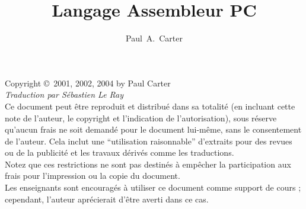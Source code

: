 \documentclass[11pt]{book}
\author{Paul~A.~Carter}
\title{Langage Assembleur PC}
\newif\ifmypdf
\begin{document}
\maketitle
\newlength{\AsmMargin}
\setlength{\AsmMargin}{-1cm}

\newcommand{\MarginNote}[1]{\marginpar{\sloppy \em \small #1}}
\thispagestyle{empty}
\vspace*{\fill}
\noindent Copyright \copyright\  2001, 2002, 2004 by Paul Carter\\
\noindent \emph{Traduction par S\'{e}bastien Le Ray}\\

\noindent Ce document peut \^{e}tre reproduit et distribu\'{e} dans sa totalit\'{e}
(en incluant cette note de l'auteur, le copyright et l'indication de
l'autorisation), sous r\'{e}serve qu'aucun frais ne soit demand\'{e} pour le
document lui-m\^{e}me, sans le consentement de l'auteur. Cela inclut une
``utilisation raisonnable'' d'extraits pour des revues ou de la publicit\'{e}
et les travaux d\'{e}riv\'{e}s comme les traductions.\\

\noindent Notez que ces restrictions ne sont pas destin\'{e}s \`{a} emp\^{e}cher la
participation aux frais pour l'impression ou la copie du document.\\

\noindent Les enseignants sont encourag\'{e}s \`{a} utiliser ce document
comme support de cours ; cependant, l'auteur apr\'{e}cierait d'\^{e}tre
averti dans ce cas.



\vfill
\frontmatter
\tableofcontents


\mainmatter







%
\begin{appendix}

\end{appendix}
\clearpage
\ifmypdf
\phantomsection %
\fi
{}
\printindex
\end{document}

